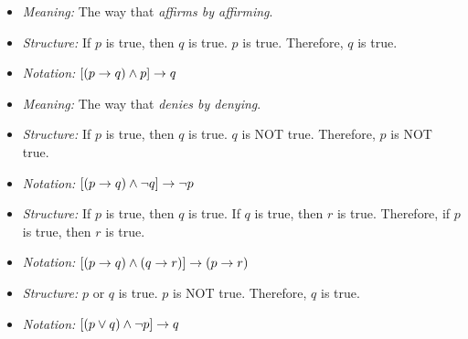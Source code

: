         \begin{itemize}
          \item \textit{Meaning:} The way that \textit{affirms by affirming}.
          \item \textit{Structure:} If $p$ is true, then $q$ is true.
            $p$ is true. Therefore, $q$ is true.
          \item \textit{Notation:} $[(p \rightarrow q) \land p] \rightarrow q$
        \end{itemize}
        \begin{itemize}
          \item \textit{Meaning:} The way that \textit{denies by denying}.
          \item \textit{Structure:} If $p$ is true, then $q$ is true.
            $q$ is NOT true. Therefore, $p$ is NOT true.
          \item \textit{Notation:} $[(p \rightarrow q) \land \lnot q] \rightarrow \lnot p$
        \end{itemize}
    \hiiiEND

        \begin{itemize}
          \item \textit{Structure:} If $p$ is true, then $q$ is true.
            If $q$ is true, then $r$ is true.
            Therefore, if $p$ is true, then $r$ is true.
          \item \textit{Notation:}
            $[(p \rightarrow q) \land (q \rightarrow r)] \rightarrow (p \rightarrow r)$
        \end{itemize}
        \begin{itemize}
          \item \textit{Structure:} $p$ or $q$ is true. $p$ is NOT true.
            Therefore, $q$ is true.
          \item \textit{Notation:}
            $[(p \lor q) \land \lnot p] \rightarrow q$
        \end{itemize}
    \hiiiEND

